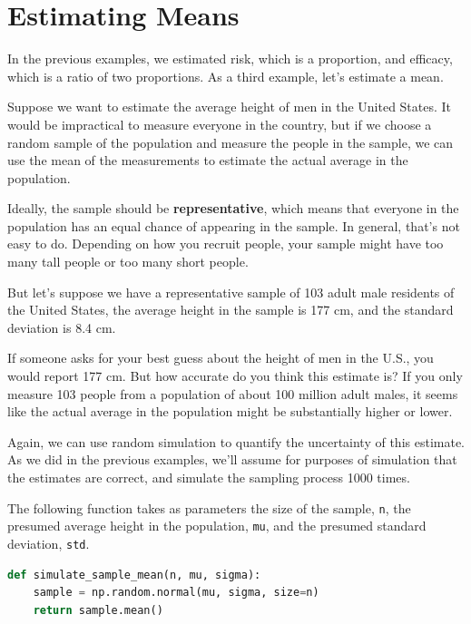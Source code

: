 \hypertarget{estimating-means}{%
\section{Estimating Means}\label{estimating-means}}

In the previous examples, we estimated risk, which is a proportion, and
efficacy, which is a ratio of two proportions. As a third example, let's
estimate a mean.

Suppose we want to estimate the average height of men in the United
States. It would be impractical to measure everyone in the country, but
if we choose a random sample of the population and measure the people in
the sample, we can use the mean of the measurements to estimate the
actual average in the population.

Ideally, the sample should be \textbf{representative}, which means that
everyone in the population has an equal chance of appearing in the
sample. In general, that's not easy to do. Depending on how you recruit
people, your sample might have too many tall people or too many short
people.

But let's suppose we have a representative sample of 103 adult male
residents of the United States, the average height in the sample is 177
cm, and the standard deviation is 8.4 cm.

If someone asks for your best guess about the height of men in the U.S.,
you would report 177 cm. But how accurate do you think this estimate is?
If you only measure 103 people from a population of about 100 million
adult males, it seems like the actual average in the population might be
substantially higher or lower.

Again, we can use random simulation to quantify the uncertainty of this
estimate. As we did in the previous examples, we'll assume for purposes
of simulation that the estimates are correct, and simulate the sampling
process 1000 times.

The following function takes as parameters the size of the sample,
\passthrough{\lstinline!n!}, the presumed average height in the
population, \passthrough{\lstinline!mu!}, and the presumed standard
deviation, \passthrough{\lstinline!std!}.

\begin{lstlisting}[language=Python,style=source]
def simulate_sample_mean(n, mu, sigma):
    sample = np.random.normal(mu, sigma, size=n)
    return sample.mean()
\end{lstlisting}

